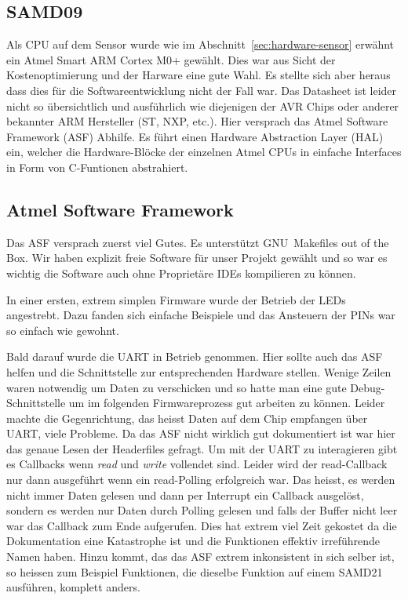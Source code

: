 \subsection{SAMD09}

Als CPU auf dem Sensor wurde wie im Abschnitt~\ref{sec:hardware-sensor} erw\"ahnt ein Atmel Smart ARM Cortex M0+ gew\"ahlt.
Dies war aus Sicht der Kostenoptimierung und der Harware eine gute Wahl. Es stellte sich aber heraus dass dies f\"ur die Softwareentwicklung nicht der Fall war.
Das Datasheet ist leider nicht so \"ubersichtlich und ausf\"uhrlich wie diejenigen der AVR Chips oder anderer bekannter ARM Hersteller (ST, NXP, etc.).
Hier versprach das Atmel Software Framework (ASF) Abhilfe. Es f\"uhrt einen Hardware Abstraction Layer (HAL) ein, welcher die Hardware-Bl\"ocke der einzelnen Atmel CPUs in einfache Interfaces in Form von C-Funtionen abstrahiert.

\subsection{Atmel Software Framework}

Das ASF versprach zuerst viel Gutes. Es unterst\"utzt GNU Makefiles out of the Box. Wir haben explizit freie Software f\"ur unser Projekt gew\"ahlt und so war es wichtig die Software auch ohne Propriet\"are IDEs kompilieren zu k\"onnen.

In einer ersten, extrem simplen Firmware wurde der Betrieb der LEDs angestrebt. Dazu fanden sich einfache Beispiele und das Ansteuern der PINs war so einfach wie gewohnt.

Bald darauf wurde die UART in Betrieb genommen. Hier sollte auch das ASF helfen und die Schnittstelle zur entsprechenden Hardware stellen. Wenige Zeilen waren notwendig um Daten zu verschicken und so hatte man eine gute Debug-Schnittstelle um im folgenden Firmwareprozess gut arbeiten zu k\"onnen.
Leider machte die Gegenrichtung, das heisst Daten auf dem Chip empfangen \"uber UART, viele Probleme. Da das ASF nicht wirklich gut dokumentiert ist war hier das genaue Lesen der Headerfiles gefragt.
Um mit der UART zu interagieren gibt es Callbacks wenn \textit{read} und \textit{write} vollendet sind. Leider wird der read-Callback nur dann ausgef\"uhrt wenn ein read-Polling erfolgreich war. Das heisst, es werden nicht immer Daten gelesen und dann per Interrupt ein Callback ausgel\"ost, sondern es werden nur Daten durch Polling gelesen und falls der Buffer nicht leer war das Callback zum Ende aufgerufen. Dies hat extrem viel Zeit gekostet da die Dokumentation eine Katastrophe ist und die Funktionen effektiv irref\"uhrende Namen haben. Hinzu kommt, das das ASF extrem inkonsistent in sich selber ist, so heissen zum Beispiel Funktionen, die dieselbe Funktion auf einem SAMD21 ausf\"uhren, komplett anders.

